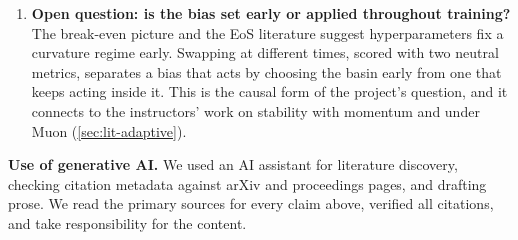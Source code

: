 \documentclass[10pt]{article}
\begin{document}
\begin{enumerate}[leftmargin=1.3em,itemsep=4pt]
\item \textbf{Open question: is the bias set early or applied throughout training?} The break-even
picture \citep{jastrzebski2020breakeven} and the EoS literature suggest hyperparameters fix a
curvature regime early. Swapping at different times, scored with two neutral metrics, separates a
bias that acts by choosing the basin early from one that keeps acting inside it. This is the causal
form of the project's question, and it connects to the instructors' work on stability with momentum
\citep{andreyev2026momentum} and under Muon (\cref{sec:lit-adaptive}).
\end{enumerate}

\otherrefs

\vspace{2pt}
{\footnotesize\textbf{Use of generative AI.} We used an AI assistant for literature discovery,
checking citation metadata against arXiv and proceedings pages, and drafting prose. We read the
primary sources for every claim above, verified all citations, and take responsibility for the
content.}
\end{document}
